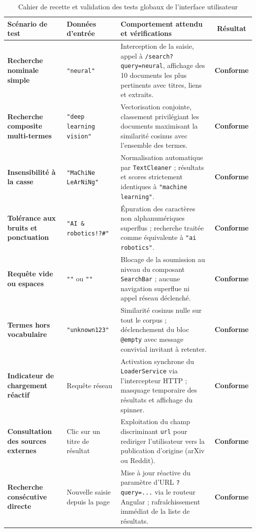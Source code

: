 \documentclass[12pt,a4paper]{article}
\begin{document}
\begin{table}[H]
	\centering
	\caption{Cahier de recette et validation des tests globaux de l'interface utilisateur}
	\label{tab:tests_globaux}
	\begin{singlespace}
	\renewcommand{\arraystretch}{1.1}
	\small
	\begin{tabularx}{\linewidth}{>{\bfseries}p{2.8cm} p{2.8cm} X c}
		\toprule
		\textbf{Scénario de test} & \textbf{Données d'entrée} & \textbf{Comportement attendu et vérifications} & \textbf{Résultat} \\
		\midrule
		Recherche nominale simple & \texttt{"neural"} & Interception de la saisie, appel à \texttt{/search?query=neural}, affichage des 10 documents les plus pertinents avec titres, liens et extraits. & \textcolor{OliveGreen}{\textbf{Conforme}} \\
		Recherche composite multi-termes & \texttt{"deep learning vision"} & Vectorisation conjointe, classement privilégiant les documents maximisant la similarité cosinus avec l'ensemble des termes. & \textcolor{OliveGreen}{\textbf{Conforme}} \\
		Insensibilité à la casse & \texttt{"MaChiNe LeArNiNg"} & Normalisation automatique par \texttt{TextCleaner} ; résultats et scores strictement identiques à \texttt{"machine learning"}. & \textcolor{OliveGreen}{\textbf{Conforme}} \\
		Tolérance aux bruits et ponctuation & \texttt{"AI \& robotics!?\#"} & Épuration des caractères non alphanumériques superflus ; recherche traitée comme équivalente à \texttt{"ai robotics"}. & \textcolor{OliveGreen}{\textbf{Conforme}} \\
		Requête vide ou espaces & \texttt{""} ou \texttt{"\quad"} & Blocage de la soumission au niveau du composant \texttt{SearchBar} ; aucune navigation superflue ni appel réseau déclenché. & \textcolor{OliveGreen}{\textbf{Conforme}} \\
		Termes hors vocabulaire & \texttt{"unknown123"} & Similarité cosinus nulle sur tout le corpus ; déclenchement du bloc \texttt{@empty} avec message convivial invitant à retenter. & \textcolor{OliveGreen}{\textbf{Conforme}} \\
		Indicateur de chargement réactif & Requête réseau & Activation synchrone du \texttt{LoaderService} via l'intercepteur HTTP ; masquage temporaire des résultats et affichage du spinner. & \textcolor{OliveGreen}{\textbf{Conforme}} \\
		Consultation des sources externes & Clic sur un titre de résultat & Exploitation du champ discriminant \texttt{url} pour rediriger l'utilisateur vers la publication d'origine (arXiv ou Reddit). & \textcolor{OliveGreen}{\textbf{Conforme}} \\
		Recherche consécutive directe & Nouvelle saisie depuis la page & Mise à jour réactive du paramètre d'URL \texttt{?query=...} via le routeur Angular ; rafraîchissement immédiat de la liste de résultats. & \textcolor{OliveGreen}{\textbf{Conforme}} \\
		\bottomrule
	\end{tabularx}
	\end{singlespace}
\end{table}
\end{document}
